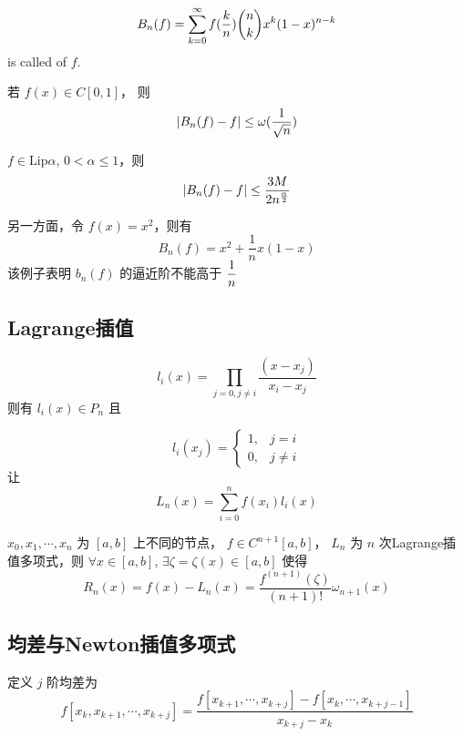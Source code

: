 \begin{definition}
    \[B_n(f)=\displaystyle\sum_{k=0}^\infty f(\frac{k}{n})\binom{n}{k}x^k(1-x)^{n-k}\]
    is called   of  $ f $. 
\end{definition}
\begin{theorem}
    若 $ f(x)\in C[0,1] $， 则
    \[|B_n(f)-f| \leq \omega(\displaystyle\frac{1}{\sqrt{n}})\] 
\end{theorem}
\begin{corollary}
    $ f\in \mathrm{Lip}\alpha $, $ 0<\alpha \leq 1 $，则
    \[|B_n(f)-f| \leq \displaystyle\frac{3M}{2n^{\frac{\alpha}{2}}}\] 
\end{corollary}

另一方面，令 $ f(x)=x^2 $，则有
\[B_n(f)=x^2+\frac{1}{n}x(1-x)\]
该例子表明 $ b_n(f) $  的逼近阶不能高于 $ \displaystyle\frac{1}{n} $ 

\subsection{Lagrange插值}
\[l_i(x)=\prod_{j=0,j\neq i}\frac{(x-x_j)}{x_i-x_j}\]
则有 $ l_i(x)\in P_n $ 且

\[l_i(x_j)=\begin{cases}
    1,&j=i\\
    0,&j\neq i
\end{cases}\]
让
\[L_n(x)=\sum_{i=0}^nf(x_i)l_i(x)\]
\begin{theorem}
    $ x_0,x_1,\cdots,x_n $ 为 $ [a,b]  $ 上不同的节点， $ f\in C^{n+1}[a,b] $， $ L_n $ 为 $ n $ 次Lagrange插值多项式，则 $ \forall x\in [a,b] $,  $ \exists \zeta=\zeta(x)\in [a,b] $ 使得 
    \[R_n(x)=f(x)-L_n(x)=\frac{f^{(n+1)}(\zeta)}{(n+1)!}\omega_{n+1}(x)\]
\end{theorem}
\subsection{均差与Newton插值多项式}
定义 $ j $ 阶均差为
\[f[x_k,x_{k+1},\cdots,x_{k+j}]=\frac{f[x_{k+1},\cdots,x_{k+j}]-f[x_k,\cdots,x_{k+j-1}]}{x_{k+j}-x_k}\]